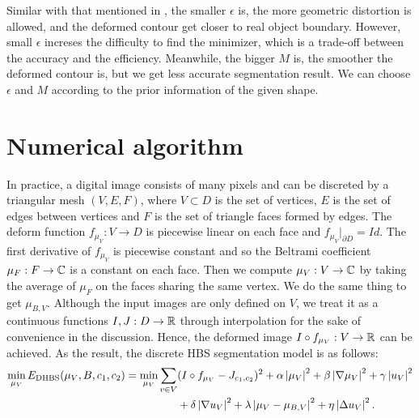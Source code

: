 \documentclass[review,onefignum,onetabnum]{siamonline190516}
\begin{document}
Similar with that mentioned in \cite{}, the smaller $\epsilon$ is, the more geometric distortion is allowed, and the deformed contour get closer to real object boundary. However, small $\epsilon$ increses the difficulty to find the minimizer, which is a trade-off between the accuracy and the efficiency. Meanwhile, the bigger $M$ is, the smoother the deformed contour is, but we get less accurate segmentation result. We can choose $\epsilon$ and $M$ according to the prior information of the given shape.

\section{Numerical algorithm}
In practice, a digital image consists of many pixels and can be discreted by a triangular mesh $(V, E, F)$, where $V \subset D$ is the set of vertices, $E$ is the set of edges between vertices and $F$ is the set of triangle faces formed by edges. The deform function $f_{\mu_V}: V \rightarrow D$ is piecewise linear on each face and $f_{\mu_V}|_{\partial D} = Id$. The first derivative of $f_{\mu_V}$ is piecewise constant and so the Beltrami coefficient $\mu_F: F \rightarrow \mathbb{C}$ is a constant on each face. Then we compute $\mu_V: V \rightarrow \mathbb{C}$ by taking the average of $\mu_F$ on the faces sharing the same vertex. We do the same thing to get $\mu_{B,V}$. Although the input images are only defined on $V$, we treat it as a continuous functions $I, J: D \rightarrow \mathbb{R}$ through interpolation for the sake of convenience in the discussion. Hence, the deformed image $I \circ f_{\mu_V}: V \rightarrow \mathbb{R}$ can be achieved. As the result, the discrete HBS segmentation model is as follows:
\begin{equation}\label{discrete hbs seg model}
    \begin{split}
        \min_{\mu_V} E_{\text{DHBS}}(\mu_V, B, c_1, c_2) = 
        \min_{\mu_V} \sum_{v \in V}
        & (I \circ f_{\mu_V} - J_{c_1,c_2})^2 
        + \alpha \abs{\mu_V}^2 + \beta \abs{\nabla \mu_V}^2 
        + \gamma \abs{u_V}^2 \\
        & + \delta \abs{\nabla u_V}^2
        + \lambda \abs{\mu_V - \mu_{B,V}}^2 + \eta \abs{\Delta u_V}^2.
    \end{split}
\end{equation}
\end{document}
